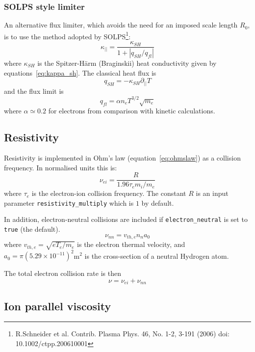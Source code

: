\documentclass[12pt,a4paper]{article}
\begin{document}
\subsubsection{SOLPS style limiter}

An alternative flux limiter, which avoids the need for an imposed scale length $R_0$, is to use the method adopted by SOLPS\footnote{R.Schneider et al. Contrib. Plasma Phys. 46, No. 1-2, 3-191 (2006) doi: 10.1002/ctpp.200610001}:
\begin{equation}
\kappa_{||} = \frac{\kappa_{SH}}{1 + \left|q_{SH} / q_{fl}\right|}
\end{equation}
where $\kappa_{SH}$ is the Spitzer-H\"arm (Braginskii) heat conductivity given by equations~\ref{eq:kappa_sh}. The classical heat flux is
\begin{equation}
q_{SH} = -\kappa_{SH} \partial_{||}T
\end{equation}
and the flux limit is
\begin{equation}
q_{fl} = \alpha n_e T^{3/2}\sqrt{m_e}
\end{equation}
where $\alpha\simeq 0.2$ for electrons from comparison with kinetic calculations.

\subsection{Resistivity}

Resistivity is implemented in Ohm's law (equation~\ref{eq:ohmslaw}) as a collision frequency. In normalised units this is:
\[
\nu_{ei} = \frac{R}{1.96\tau_e m_i/m_e}
\]
where $\tau_e$ is the electron-ion collision frequency. The constant $R$ is an input parameter \texttt{resistivity\_multiply} which is $1$ by default.

In addition, electron-neutral collisions are included if \texttt{electron\_neutral} is set to \texttt{true} (the default).
\[
\nu_{nn} = v_{th,e} n_n a_0
\]
where $v_{th,e} = \sqrt{eT_e/m_e}$ is the electron thermal velocity, and $a_0 = \pi \left(5.29\times 10^{-11}\right)^2$m$^2$
 is the cross-section of a neutral Hydrogen atom.

The total electron collision rate is then
\begin{equation}
\nu = \nu_{ei} + \nu_{nn}
\end{equation}

\subsection{Ion parallel viscosity}
\end{document}
